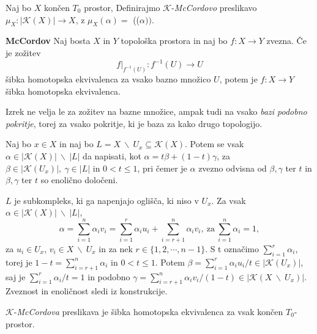 \documentclass[mat1]{fmfdelo}
\DeclareRobustCommand{\k}{
    \mathcal{K}
}
\begin{document}
 \begin{definicija}
    Naj bo $X$ končen $T_0$ prostor, Definirajmo
    $\mathcal{K}$-\textit{McCordovo} preslikavo $\mu_X:|\mathcal{K}
    (X)|\rightarrow X$, z $\mu_X(\alpha) =$
    (($\alpha))$.
\end{definicija}



\begin{izrek}{\textbf{McCordov}}\label{iz:mccord}
    Naj bosta $X$ in $Y$ topološka prostora in naj bo $f:X\rightarrow Y$ zvezna. Če je zožitev
    $$
    f|_{f^{-1}(U)}:f^{-1}(U)\rightarrow U
    $$
    šibka homotopska ekvivalenca za vsako bazno množico $U$, potem je $f:X\rightarrow Y$  šibka homotopska ekvivalenca.
\end{izrek}

\begin{opomba}
    Izrek ne velja le za zožitev na bazne množice, ampak tudi na vsako \textit{bazi podobno pokritje}, torej za vsako pokritje, ki je baza za kako drugo topologijo.
\end{opomba}



\begin{lema}\label{lem:sibka}
    Naj bo $x\in X$ in naj bo $L=X\ \backslash \
    U_x\subseteq \mathcal{K}(X)$. Potem se vsak $\alpha \in |\k(X)|\ \backslash \ |L|$ da napisati, kot $\alpha = t\beta + (1-t)\gamma$, za $\beta \in |\k(U_x)|, \ \gamma \in |L|$ in $0<t\leq 1$, pri čemer je $\alpha$ zvezno odvisna od $\beta, \gamma$ ter $t$ in $\beta, \gamma$ ter $t$ so enolično določeni.
\end{lema}
\begin{dokaz}
    $L$ je subkompleks, ki ga napenjajo oglišča, ki niso v $U_x$. Za vsak $\alpha \in |\k(X)|\ \backslash \ |L|$, 
    $$\alpha = \sum_{i=1}^{n} \alpha_i v_i 
    = \sum_{i=1}^{r} \alpha_i u_i + \sum_{i=r+1}^{n}\alpha_i v_i,\ \text{za}\ \sum_{i=1}^{n} \alpha_i=1,
    $$
    za $u_i \in U_x$, $v_i \in X \ \backslash \ U_x$ in za nek $r\in \{1,2, \cdots, n-1\}$. S t označimo $\sum_{i=1}^{r} \alpha_i$, torej je $1-t=\sum_{i=r+1}^{n} \alpha_i$ in $0<t\leq 1$. Potem $\beta =\sum_{i=1}^{r} \alpha_i u_i/t \in |\k(U_x)|$, saj je $\sum_{i=1}^{r} \alpha_i/t=1$ in podobno $\gamma=\sum_{i=r+1}^{n} 
    \alpha_i v_i/(1-t) \in |\k(X \ \backslash \ U_x)|$. Zveznost in enoličnost sledi iz konstrukcije.

\end{dokaz}

\begin{izrek}
    \label{iz:ksibka}
    $\mathcal{K}$-\textit{McCordova} preslikava je šibka homotopska 
    ekvivalenca za vsak končen $T_0$-prostor.
\end{izrek}
\end{document}
